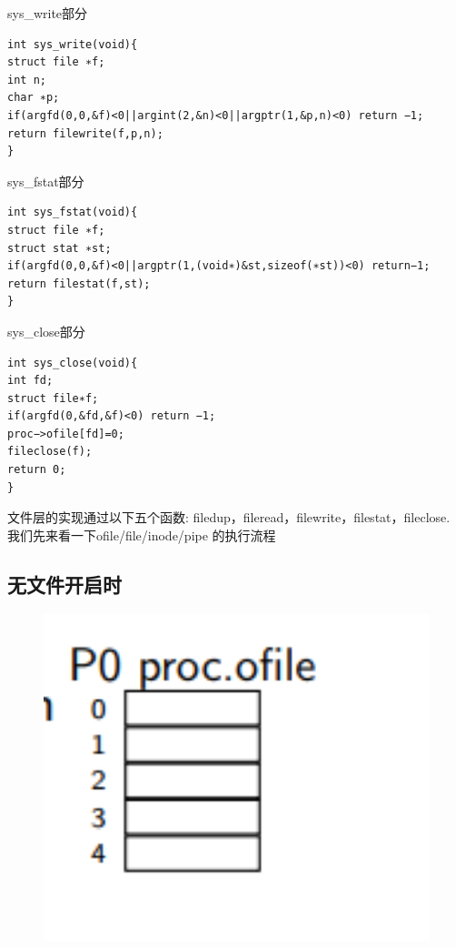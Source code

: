 \documentclass[a4paper,12pt]{report}
\begin{document}
sys\_write部分
\begin{lstlisting}
int sys_write(void){
struct file ∗f;
int n;
char ∗p;
if(argfd(0,0,&f)<0||argint(2,&n)<0||argptr(1,&p,n)<0) return −1;
return filewrite(f,p,n);
}

\end{lstlisting}
sys\_fstat部分
\begin{lstlisting}
int sys_fstat(void){
struct file ∗f;
struct stat ∗st;
if(argfd(0,0,&f)<0||argptr(1,(void∗)&st,sizeof(∗st))<0) return−1;
return filestat(f,st);
}
\end{lstlisting}
sys\_close部分
\begin{lstlisting}
int sys_close(void){
int fd;
struct file∗f;
if(argfd(0,&fd,&f)<0) return −1;
proc−>ofile[fd]=0;
fileclose(f);
return 0;
}
\end{lstlisting}

文件层的实现通过以下五个函数:
filedup，fileread，filewrite，filestat，fileclose.
我们先来看一下ofile/file/inode/pipe 的执行流程
\subsection{ 无文件开启时}
\begin{figure}[H]
	\centering
	\includegraphics [width=1.0\textwidth]{figure//image156.png}
\end{figure}
\end{document}
